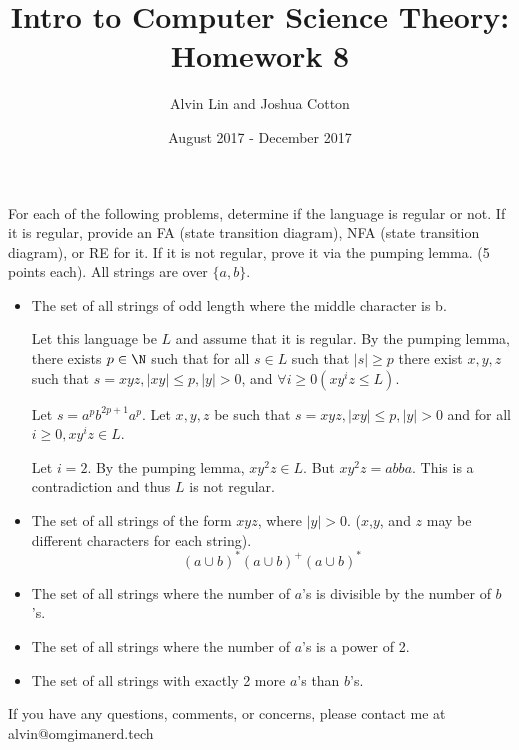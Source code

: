 \documentclass{math}
\title{Intro to Computer Science Theory: Homework 8}
\author{Alvin Lin and Joshua Cotton}
\date{August 2017 - December 2017}
\begin{document}
\maketitle

For each of the following problems, determine if the language is regular or
not. If it is regular, provide an FA (state transition diagram), NFA (state
transition diagram), or RE for it. If it is not regular, prove it via the
pumping lemma. (5 points each). All strings are over \( \{a,b\} \).
\begin{itemize}
  \item The set of all strings of odd length where the middle character is b.
  \par
  Let this language be \( L \) and assume that it is regular. By the pumping
  lemma, there exists \( p\in\N \) such that for all \( s\in L \) such that
  \( |s|\ge p \) there exist \( x,y,z \) such that \( s = xyz, |xy|\le p, |y|>0
  \), and \( \forall{i}\ge0(xy^iz\le L) \). \par
  Let \( s = a^pb^{2p+1}a^p \). Let \( x,y,z \) be such that
  \( s = xyz, |xy|\le p, |y|>0 \) and for all \( i\ge0, xy^iz\in L \). \par
  Let \( i = 2 \). By the pumping lemma, \( xy^2z\in L \). But \( xy^2z =
  abba \). This is a contradiction and thus \( L \) is not regular.
  \item The set of all strings of the form \( xyz \), where \( |y|>0 \).
  (\( x \),\( y \), and \( z \) may be different characters for each string).
  \[ (a\cup b)^*(a\cup b)^+(a\cup b)^* \]
  \item The set of all strings where the number of \( a \)'s is divisible by
  the number of \( b \)'s.
  \item The set of all strings where the number of \( a \)'s is a power of 2.
  \item The set of all strings with exactly 2 more \( a \)'s than \( b \)'s.
\end{itemize}

\begin{center}
  If you have any questions, comments, or concerns, please contact me at
  alvin@omgimanerd.tech
\end{center}
\end{document}
